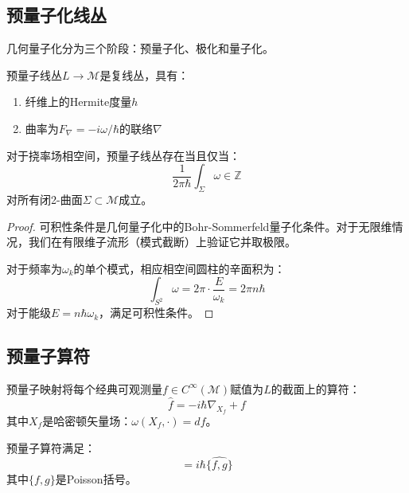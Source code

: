 \subsection{预量子化线丛}

几何量子化分为三个阶段：预量子化、极化和量子化。

\begin{definition}[预量子线丛]
预量子线丛$L \to \mathcal{M}$是复线丛，具有：
\begin{enumerate}
    \item 纤维上的Hermite度量$h$
    \item 曲率为$F_\nabla = -i\omega/\hbar$的联络$\nabla$
\end{enumerate}
\end{definition}

\begin{theorem}[预量子线丛的存在性]
对于挠率场相空间，预量子线丛存在当且仅当：
\begin{equation}
    \frac{1}{2\pi\hbar} \int_\Sigma \omega \in \mathbb{Z}
\end{equation}
对所有闭2-曲面$\Sigma \subset \mathcal{M}$成立。
\end{theorem}

\begin{proof}
可积性条件是几何量子化中的Bohr-Sommerfeld量子化条件。对于无限维情况，我们在有限维子流形（模式截断）上验证它并取极限。

对于频率为$\omega_k$的单个模式，相应相空间圆柱的辛面积为：
\begin{equation}
    \int_{S^2} \omega = 2\pi \cdot \frac{E}{\omega_k} = 2\pi n \hbar
\end{equation}
对于能级$E = n\hbar\omega_k$，满足可积性条件。
\end{proof}

\subsection{预量子算符}

\begin{definition}[预量子映射]
预量子映射将每个经典可观测量$f \in C^\infty(\mathcal{M})$赋值为$L$的截面上的算符：
\begin{equation}
    \hat{f} = -i\hbar \nabla_{X_f} + f
\end{equation}
其中$X_f$是哈密顿矢量场：$\omega(X_f, \cdot) = df$。
\end{definition}

\begin{theorem}[预量子化表示]
预量子算符满足：
\begin{equation}
    [\hat{f}, \hat{g}] = i\hbar \widehat{\{f, g\}}
\end{equation}
其中$\{f, g\}$是Poisson括号。
\end{theorem}

